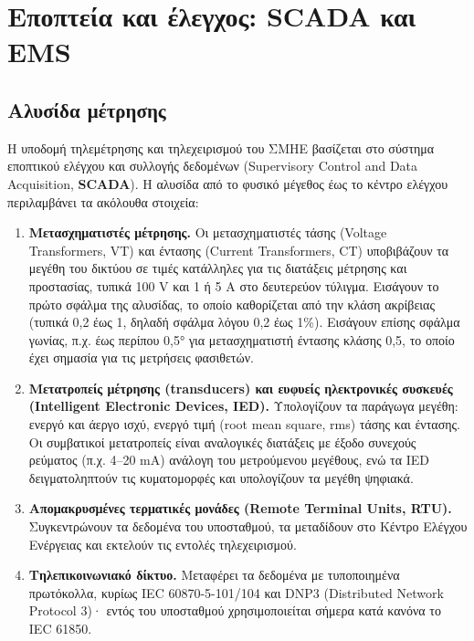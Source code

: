 \section{Εποπτεία και έλεγχος: SCADA και EMS}

\subsection{Αλυσίδα μέτρησης}
\label{sec:meas-chain}

Η υποδομή τηλεμέτρησης και τηλεχειρισμού του ΣΜΗΕ βασίζεται στο σύστημα εποπτικού ελέγχου
και συλλογής δεδομένων (Supervisory Control and Data Acquisition, \textbf{SCADA}). Η αλυσίδα
από το φυσικό μέγεθος έως το κέντρο ελέγχου περιλαμβάνει τα ακόλουθα στοιχεία:

\begin{enumerate}
\item \textbf{Μετασχηματιστές μέτρησης.} Οι μετασχηματιστές τάσης (Voltage Transformers, VT) και
      έντασης (Current Transformers, CT)
      υποβιβάζουν τα μεγέθη του δικτύου σε τιμές κατάλληλες για τις διατάξεις μέτρησης
      και προστασίας, τυπικά 100 V και 1 ή 5 A στο δευτερεύον τύλιγμα. Εισάγουν το πρώτο
      σφάλμα της αλυσίδας, το οποίο καθορίζεται από την κλάση ακρίβειας (τυπικά 0,2 έως 1,
      δηλαδή σφάλμα λόγου 0,2 έως 1\%). Εισάγουν επίσης σφάλμα γωνίας, π.χ. έως περίπου 0,5°
      για μετασχηματιστή έντασης κλάσης 0,5, το οποίο έχει σημασία για τις μετρήσεις
      φασιθετών.
\item \textbf{Μετατροπείς μέτρησης (transducers) και ευφυείς ηλεκτρονικές συσκευές (Intelligent
      Electronic Devices, IED).}
      Υπολογίζουν τα παράγωγα μεγέθη: ενεργό και άεργο ισχύ, ενεργό τιμή (root mean
      square, rms) τάσης και έντασης. Οι συμβατικοί μετατροπείς είναι αναλογικές διατάξεις με
      έξοδο συνεχούς ρεύματος (π.χ. 4--20 mA) ανάλογη του μετρούμενου μεγέθους, ενώ τα IED
      δειγματοληπτούν τις κυματομορφές και υπολογίζουν τα μεγέθη ψηφιακά.
\item \textbf{Απομακρυσμένες τερματικές μονάδες (Remote Terminal Units, RTU).} Συγκεντρώνουν τα δεδομένα του
      υποσταθμού, τα μεταδίδουν στο Κέντρο Ελέγχου Ενέργειας και εκτελούν τις εντολές
      τηλεχειρισμού.
\item \textbf{Τηλεπικοινωνιακό δίκτυο.} Μεταφέρει τα δεδομένα με τυποποιημένα πρωτόκολλα,
      κυρίως IEC 60870-5-101/104 και DNP3 (Distributed Network Protocol 3)· εντός του υποσταθμού χρησιμοποιείται σήμερα
      κατά κανόνα το IEC 61850.
\end{enumerate}

